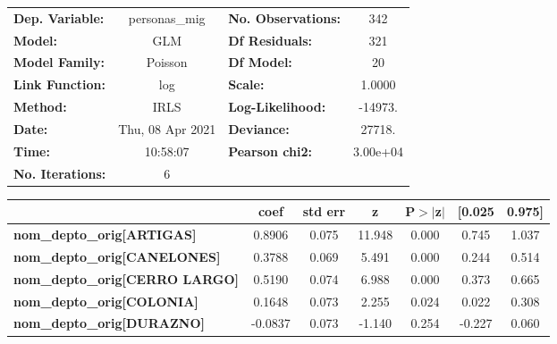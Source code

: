 \begin{center}
\begin{tabular}{lclc}
\toprule
\textbf{Dep. Variable:}                   &  personas\_mig   & \textbf{  No. Observations:  } &      342    \\
\textbf{Model:}                           &       GLM        & \textbf{  Df Residuals:      } &      321    \\
\textbf{Model Family:}                    &     Poisson      & \textbf{  Df Model:          } &       20    \\
\textbf{Link Function:}                   &       log        & \textbf{  Scale:             } &    1.0000   \\
\textbf{Method:}                          &       IRLS       & \textbf{  Log-Likelihood:    } &   -14973.   \\
\textbf{Date:}                            & Thu, 08 Apr 2021 & \textbf{  Deviance:          } &    27718.   \\
\textbf{Time:}                            &     10:58:07     & \textbf{  Pearson chi2:      } &  3.00e+04   \\
\textbf{No. Iterations:}                  &        6         & \textbf{                     } &             \\
\bottomrule
\end{tabular}
\begin{tabular}{lcccccc}
                                          & \textbf{coef} & \textbf{std err} & \textbf{z} & \textbf{P$> |$z$|$} & \textbf{[0.025} & \textbf{0.975]}  \\
\midrule
\textbf{nom\_depto\_orig[ARTIGAS]}        &       0.8906  &        0.075     &    11.948  &         0.000        &        0.745    &        1.037     \\
\textbf{nom\_depto\_orig[CANELONES]}      &       0.3788  &        0.069     &     5.491  &         0.000        &        0.244    &        0.514     \\
\textbf{nom\_depto\_orig[CERRO LARGO]}    &       0.5190  &        0.074     &     6.988  &         0.000        &        0.373    &        0.665     \\
\textbf{nom\_depto\_orig[COLONIA]}        &       0.1648  &        0.073     &     2.255  &         0.024        &        0.022    &        0.308     \\
\textbf{nom\_depto\_orig[DURAZNO]}        &      -0.0837  &        0.073     &    -1.140  &         0.254        &       -0.227    &        0.060     \\

\end{tabular}
\end{center}
